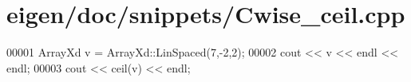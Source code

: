 \hypertarget{eigen_2doc_2snippets_2_cwise__ceil_8cpp_source}{}\section{eigen/doc/snippets/\+Cwise\+\_\+ceil.cpp}
\label{eigen_2doc_2snippets_2_cwise__ceil_8cpp_source}

\begin{DoxyCode}
00001 ArrayXd v = ArrayXd::LinSpaced(7,-2,2);
00002 cout << v << endl << endl;
00003 cout << ceil(v) << endl;
\end{DoxyCode}
